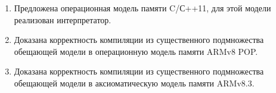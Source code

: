 {{}
\begin{enumerate}
  \item Предложена операционная модель памяти C/С++11, для этой модели реализован интерпретатор.
  \item Доказана корректность компиляции из существенного подмножества обещающей модели в операционную модель памяти ARMv8 POP.
  \item Доказана корректность компиляции из существенного подмножества обещающей модели в аксиоматическую модель памяти ARMv8.3.
\end{enumerate}
}

